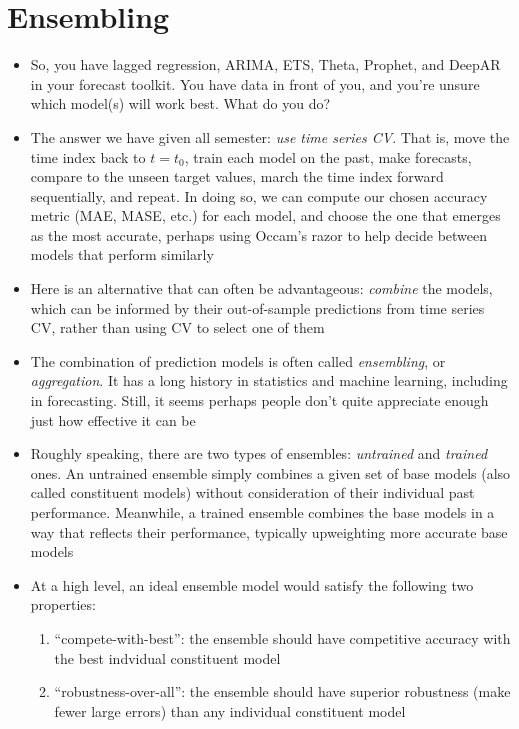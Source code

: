 \documentclass{article}
\begin{document}
\section{Ensembling}

\begin{itemize}
\item So, you have lagged regression, ARIMA, ETS, Theta, Prophet, and DeepAR in
  your forecast toolkit. You have data in front of you, and you're unsure which
  model(s) will work best. What do you do?    

\item The answer we have given all semester: \emph{use time series CV}. That is,
  move the time index back to $t = t_0$, train each model on the past, make 
  forecasts, compare to the unseen target values, march the time index forward
  sequentially, and repeat. In doing so, we can compute our chosen accuracy
  metric (MAE, MASE, etc.) for each model, and choose the one that emerges as 
  the most accurate, perhaps using Occam's razor to help decide between models
  that perform similarly

\item Here is an alternative that can often be advantageous: \emph{combine} the
  models, which can be informed by their out-of-sample predictions from time 
  series CV, rather than using CV to select one of them
  
\item The combination of prediction models is often called \emph{ensembling}, or
  \emph{aggregation}. It has a long history in statistics and machine learning,
  including in forecasting. Still, it seems perhaps people don't quite
  appreciate enough just how effective it can be

\item Roughly speaking, there are two types of ensembles: \emph{untrained} and
  \emph{trained} ones. An untrained ensemble simply combines a given set of 
  base models (also called constituent models) without consideration of
  their individual past performance. Meanwhile, a trained ensemble combines the
  base models in a way that reflects their performance, typically upweighting
  more accurate base models 

\item At a high level, an ideal ensemble model would satisfy the following two
  properties:
  \begin{enumerate}
  \item ``compete-with-best'': the ensemble should have competitive accuracy
    with the best indvidual constituent model  
  \item ``robustness-over-all'': the ensemble should have superior robustness 
    (make fewer large errors) than any individual constituent model  
  \end{enumerate}


\end{itemize}
\end{document}
